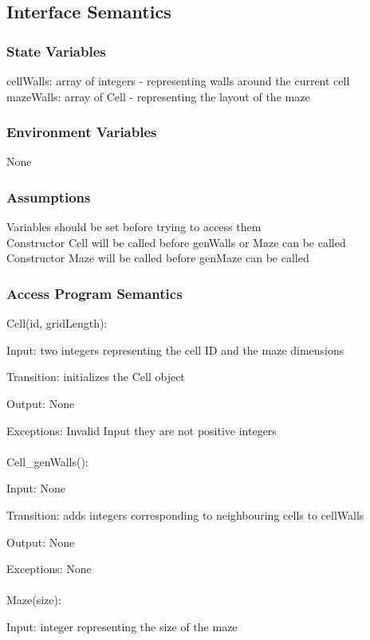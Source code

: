 \documentclass[12pt, titlepage]{article}
\begin{document}
		\subsection{Interface Semantics}
		\subsubsection{State Variables}
		cellWalls: array of integers - representing walls around the current cell\\
		mazeWalls: array of Cell - representing the layout of the maze
		
		\subsubsection{Environment Variables}
		None
		
		\subsubsection{Assumptions}
		Variables should be set before trying to access them \\ 
		Constructor Cell will be called before genWalls or Maze can be called \\
	    Constructor Maze will be called before genMaze can be called
		
		\subsubsection{Access Program Semantics}
		Cell(id, gridLength):
		
		Input: two integers representing the cell ID and the maze dimensions
		
		Transition: initializes the Cell object
		
		Output: None
		
		Exceptions: Invalid Input they are not positive integers\\
		\\
		Cell\_genWalls():
		
		Input: None
		
		Transition: adds integers corresponding to neighbouring cells to cellWalls
		
		Output: None
		
		Exceptions: None\\
		\\
		Maze(size):
		
		Input: integer representing the size of the maze
		
\end{document}
